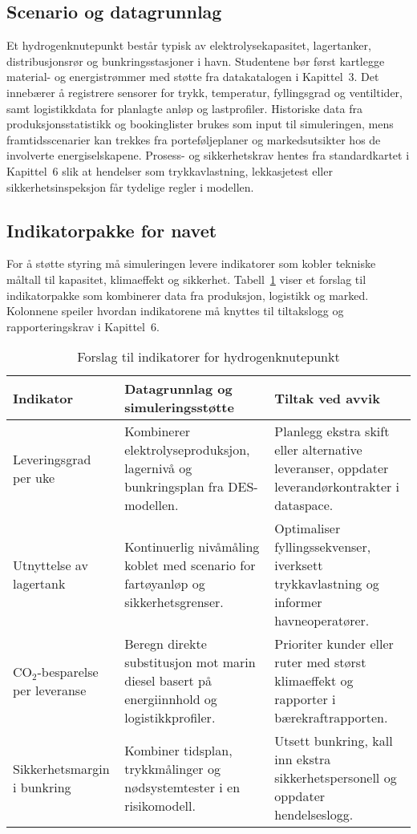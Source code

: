 \subsection{Scenario og datagrunnlag}
Et hydrogenknutepunkt består typisk av elektrolysekapasitet, lagertanker, distribusjonsrør og bunkringsstasjoner i havn. Studentene bør først kartlegge material- og energistrømmer med støtte fra datakatalogen i Kapittel~3. Det innebærer å registrere sensorer for trykk, temperatur, fyllingsgrad og ventiltider, samt logistikkdata for planlagte anløp og lastprofiler. Historiske data fra produksjonsstatistikk og bookinglister brukes som input til simuleringen, mens framtidsscenarier kan trekkes fra porteføljeplaner og markedsutsikter hos de involverte energiselskapene. Prosess- og sikkerhetskrav hentes fra standardkartet i Kapittel~6 slik at hendelser som trykkavlastning, lekkasjetest eller sikkerhetsinspeksjon får tydelige regler i modellen.

\subsection{Indikatorpakke for navet}
For å støtte styring må simuleringen levere indikatorer som kobler tekniske måltall til kapasitet, klimaeffekt og sikkerhet. Tabell~\ref{tab:kap04-hydrogen-indikatorer} viser et forslag til indikatorpakke som kombinerer data fra produksjon, logistikk og marked. Kolonnene speiler hvordan indikatorene må knyttes til tiltakslogg og rapporteringskrav i Kapittel~6.

\begin{table}[htbp]
    \centering
    \caption{Forslag til indikatorer for hydrogenknutepunkt}
    \label{tab:kap04-hydrogen-indikatorer}
    \begin{tabular}{p{}p{}p{}}
        \toprule
        \textbf{Indikator} & \textbf{Datagrunnlag og simuleringsstøtte} & \textbf{Tiltak ved avvik}\\
        \midrule
        Leveringsgrad per uke & Kombinerer elektrolyseproduksjon, lagernivå og bunkringsplan fra DES-modellen. & Planlegg ekstra skift eller alternative leveranser, oppdater leverandørkontrakter i dataspace.\\
        \addlinespace
        Utnyttelse av lagertank & Kontinuerlig nivåmåling koblet med scenario for fartøyanløp og sikkerhetsgrenser. & Optimaliser fyllingssekvenser, iverksett trykkavlastning og informer havneoperatører.\\
        \addlinespace
        CO$_2$-besparelse per leveranse & Beregn direkte substitusjon mot marin diesel basert på energiinnhold og logistikkprofiler. & Prioriter kunder eller ruter med størst klimaeffekt og rapporter i bærekraftrapporten.\\
        \addlinespace
        Sikkerhetsmargin i bunkring & Kombiner tidsplan, trykkmålinger og nødsystemtester i en risikomodell. & Utsett bunkring, kall inn ekstra sikkerhetspersonell og oppdater hendelseslogg.\\
        \bottomrule
    \end{tabular}
\end{table}

